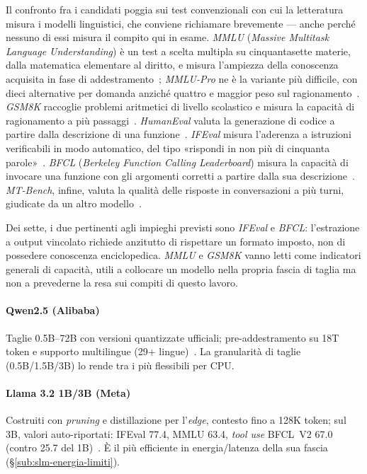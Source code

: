 Il confronto fra i candidati poggia sui test convenzionali con cui la letteratura misura i modelli linguistici, che conviene richiamare brevemente --- anche perché nessuno di essi misura il compito qui in esame. \textit{MMLU} (\textit{Massive Multitask Language Understanding}) è un test a scelta multipla su cinquantasette materie, dalla matematica elementare al diritto, e misura l'ampiezza della conoscenza acquisita in fase di addestramento~\cite{hendrycksMeasuringMassiveMultitask2021}; \textit{MMLU-Pro} ne è la variante più difficile, con dieci alternative per domanda anziché quattro e maggior peso sul ragionamento~\cite{wangMMLUProMoreRobust2024}. \textit{GSM8K} raccoglie problemi aritmetici di livello scolastico e misura la capacità di ragionamento a più passaggi~\cite{cobbeTrainingVerifiersSolve2021}. \textit{HumanEval} valuta la generazione di codice a partire dalla descrizione di una funzione~\cite{chenEvaluatingLargeLanguage2021}. \textit{IFEval} misura l'aderenza a istruzioni verificabili in modo automatico, del tipo «rispondi in non più di cinquanta parole»~\cite{zhouInstructionFollowingEvaluation2023}. \textit{BFCL} (\textit{Berkeley Function Calling Leaderboard}) misura la capacità di invocare una funzione con gli argomenti corretti a partire dalla sua descrizione~\cite{patilBerkeleyFunctionCalling2025}. \textit{MT-Bench}, infine, valuta la qualità delle risposte in conversazioni a più turni, giudicate da un altro modello~\cite{zhengJudgingLLMasaJudge2023}. \medskip

Dei sette, i due pertinenti agli impieghi previsti sono \textit{IFEval} e \textit{BFCL}: l'estrazione a output vincolato richiede anzitutto di rispettare un formato imposto, non di possedere conoscenza enciclopedica. \textit{MMLU} e \textit{GSM8K} vanno letti come indicatori generali di capacità, utili a collocare un modello nella propria fascia di taglia ma non a prevederne la resa sui compiti di questo lavoro. \medskip

\paragraph*{Qwen2.5 (Alibaba)} Taglie 0.5B--72B con versioni quantizzate ufficiali; pre-addestramento su 18T token e supporto multilingue (29+ lingue)~\cite{qwen2025qwen25}. La granularità di taglie (0.5B/1.5B/3B) lo rende tra i più flessibili per CPU.

\paragraph*{Llama 3.2 1B/3B (Meta)} Costruiti con \textit{pruning} e distillazione per l'\textit{edge}, contesto fino a 128K token; sul 3B, valori auto-riportati: IFEval 77.4, MMLU 63.4, \textit{tool use} BFCL~V2 67.0 (contro 25.7 del 1B)~\cite{metaai2024llama32}. È il più efficiente in energia/latenza della sua fascia (§\ref{sub:slm-energia-limiti}).

